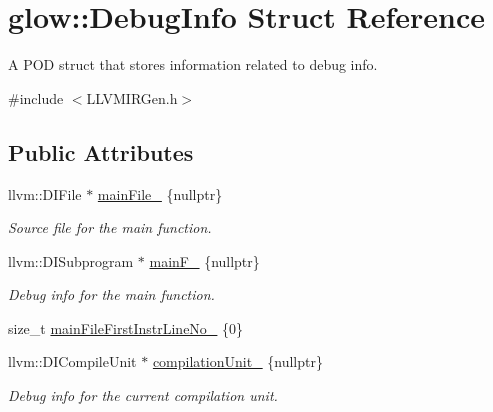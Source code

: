 \hypertarget{structglow_1_1_debug_info}{}\section{glow\+:\+:Debug\+Info Struct Reference}
\label{structglow_1_1_debug_info}


A P\+OD struct that stores information related to debug info.  




{\ttfamily \#include $<$L\+L\+V\+M\+I\+R\+Gen.\+h$>$}

\subsection*{Public Attributes}
\begin{DoxyCompactItemize}
\item 
\mbox{\label{structglow_1_1_debug_info_a5eb1e7fae412c7d8d0fdc18cdd47e4fe}} 
llvm\+::\+D\+I\+File $\ast$ \hyperlink{structglow_1_1_debug_info_a5eb1e7fae412c7d8d0fdc18cdd47e4fe}{main\+File\+\_\+} \{nullptr\}
\begin{DoxyCompactList}\small\item\em Source file for the main function. \end{DoxyCompactList}\item 
\mbox{\label{structglow_1_1_debug_info_a00b411ee4fb3ffc6e3671b8076433abc}} 
llvm\+::\+D\+I\+Subprogram $\ast$ \hyperlink{structglow_1_1_debug_info_a00b411ee4fb3ffc6e3671b8076433abc}{main\+F\+\_\+} \{nullptr\}
\begin{DoxyCompactList}\small\item\em Debug info for the main function. \end{DoxyCompactList}\item 
size\+\_\+t \hyperlink{structglow_1_1_debug_info_a099a2636f46176f7804f55b2374c64c2}{main\+File\+First\+Instr\+Line\+No\+\_\+} \{0\}
\item 
\mbox{\label{structglow_1_1_debug_info_a936ef696ae6bc75112f0f4a0047a496d}} 
llvm\+::\+D\+I\+Compile\+Unit $\ast$ \hyperlink{structglow_1_1_debug_info_a936ef696ae6bc75112f0f4a0047a496d}{compilation\+Unit\+\_\+} \{nullptr\}
\begin{DoxyCompactList}\small\item\em Debug info for the current compilation unit. \end{DoxyCompactList}\item 

\end{DoxyCompactItemize}
